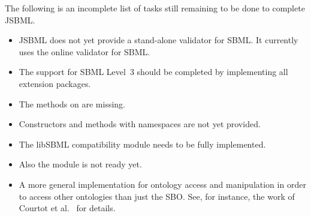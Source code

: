 
The following is an incomplete list of tasks still remaining to be done to
complete JSBML.

\begin{itemize}

\item JSBML does not yet provide a stand-alone validator for SBML. It
  currently uses the online validator for SBML.

\item The support for SBML Level~3 should be completed
  by implementing all extension packages.

\item The 
  methods on  are missing.

\item Constructors and methods with namespaces are not yet provided.

\item The libSBML compatibility module
  needs to be fully implemented.

\item Also the  module is not ready yet.

\item A more general implementation for ontology access and manipulation in
  order to access other ontologies than just the SBO. See, for instance,
  the work of Courtot et al.~\cite{Courtot2011a} for details.

\end{itemize}
